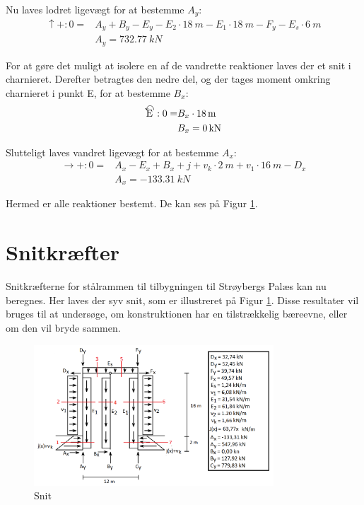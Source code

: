 Nu laves lodret ligevægt for at bestemme $A_y$:
\begin{equation}
\begin{split}
	\uparrow+: 0 = & A_y + B_y - E_y - E_2 \cdot \SI{18}{m} - E_1 \cdot \SI{18}{m} - F_y - E_s \cdot \SI{6}{m}
	\\ &
	A_y = \SI{732,77}{kN}
\end{split}
\end{equation}

For at gøre det muligt at isolere en af de vandrette reaktioner laves der et snit i charnieret. Derefter betragtes den nedre del, og der tages moment omkring charnieret i punkt E, for at bestemme $B_x$:
\begin{equation}
\begin{split}
	\ALN{\text{E}}: 0 = & B_x \cdot \SI{18}{m}
	\\ &
	B_x = \SI{0}{kN}
\end{split}
\end{equation}

Slutteligt laves vandret ligevægt for at bestemme $A_x$:
\begin{equation}
\begin{split}
	\rightarrow+: 0 = & A_x - E_x + B_x + j + v_k \cdot \SI{2}{m} + v_1 \cdot \SI{16}{m} - D_x
	\\ &
	A_x = \SI{-133,31}{kN}
\end{split}
\end{equation} 

Hermed er alle reaktioner bestemt. De kan ses på Figur \ref{fig:snitbrud}.

\section{Snitkræfter}
Snitkræfterne for stålrammen til tilbygningen til Strøybergs Palæs kan nu beregnes. Her laves der syv snit, som er illustreret på Figur \ref{fig:snitbrud}. Disse resultater vil bruges til at undersøge, om konstruktionen har en tilstrækkelig bæreevne, eller om den vil bryde sammen.

\begin{figure}[H]
	\centering
	\includegraphics[width=0.8\textwidth]{billeder/snitbrud.png}
	\caption{Snit}
	\label{fig:snitbrud}
\end{figure}

